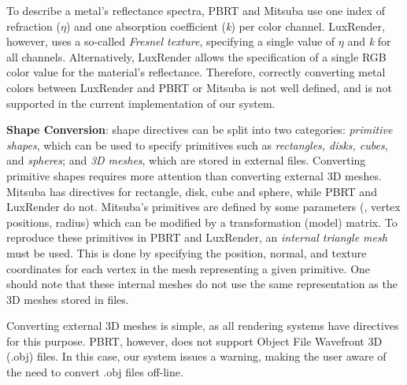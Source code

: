 To describe a metal's reflectance spectra, PBRT and Mitsuba use one index of refraction ($\eta$) and one absorption 
coefficient (\textit{k}) per color channel. 
LuxRender, however, uses a so-called {\it Fresnel texture}, specifying a 
single value of $\eta$ and \textit{k} for all channels. Alternatively, LuxRender allows the specification of a single RGB 
color value for the material's reflectance. Therefore, correctly converting metal colors between LuxRender and PBRT or Mitsuba is not well defined, 
and is not supported in the current implementation of our system.

\textbf{Shape Conversion}: 
shape directives can be split into two categories: {\it primitive shapes}, which can
be used to specify primitives such as {\it rectangles, disks, cubes}, and {\it spheres};
and {\it 3D meshes}, which are stored in external files. 
%
Converting primitive shapes requires more attention than converting external 3D meshes. 
Mitsuba has directives for rectangle, disk, cube and sphere, while PBRT and LuxRender do not. 
Mitsuba's primitives are defined by some parameters (\eg, vertex positions, radius) which can be modified by 
a transformation (model) matrix. To reproduce these primitives in PBRT and 
LuxRender, an {\it internal triangle mesh} must be used. This is done by specifying the position, normal, and texture coordinates for each vertex in the mesh representing a given primitive. One should note that these internal meshes do not use the same representation as the 3D meshes stored in files.


Converting external 3D meshes is simple, as all rendering systems have directives
for this purpose. PBRT, however, does not support Object File Wavefront 3D
(.obj) files. 
In this case, our system issues a warning, making the user aware of the need to convert .obj files off-line.


